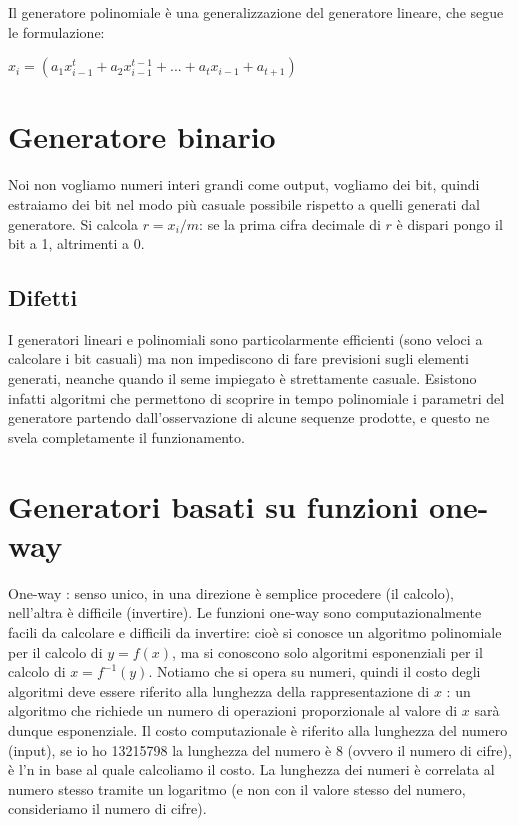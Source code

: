Il generatore polinomiale è una generalizzazione del generatore lineare, che segue le formulazione:

$x_i = (a_1 x^{t}_{i-1} + a_2 x^{t-1}_{i-1} + ... + a_t x_{i-1} + a_{t + 1})$

\section{Generatore binario}

Noi non vogliamo numeri interi grandi come output, vogliamo dei bit, quindi estraiamo dei bit nel modo più casuale possibile rispetto a quelli generati dal generatore. Si calcola $r = x_i / m$: se la prima cifra decimale di $r$ è dispari pongo il bit a 1, altrimenti a 0.

\subsection{Difetti}

I generatori lineari e polinomiali sono particolarmente efficienti (sono veloci a calcolare i bit casuali) ma non impediscono di fare previsioni sugli elementi generati, neanche quando il seme impiegato è strettamente casuale. Esistono infatti algoritmi che permettono di scoprire in tempo polinomiale i parametri del generatore partendo dall’osservazione di alcune
sequenze prodotte, e questo ne svela completamente il funzionamento.

\section{Generatori basati su funzioni one-way}
One-way : senso unico, in una direzione è semplice procedere (il calcolo), nell'altra è difficile (invertire).
Le funzioni one-way sono computazionalmente facili da calcolare e difficili da invertire: cioè si conosce un algoritmo polinomiale per il calcolo di $y=f(x)$, ma si conoscono solo algoritmi esponenziali per il calcolo di $x=f^{-1}(y)$. Notiamo che si opera su numeri, quindi il
costo degli algoritmi deve essere riferito alla lunghezza
della rappresentazione di $x$ : un algoritmo che richiede un
numero di operazioni proporzionale al valore di $x$ sarà
dunque esponenziale. Il costo computazionale è riferito alla lunghezza del numero (input), se io ho 13215798 la lunghezza del numero è 8 (ovvero il numero di cifre), è l'n in base al quale calcoliamo il costo. La lunghezza dei numeri è correlata al numero stesso tramite un logaritmo (e non con il valore stesso del numero, consideriamo il numero di cifre). 

